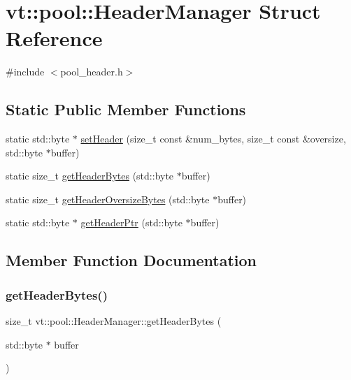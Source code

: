\hypertarget{structvt_1_1pool_1_1_header_manager}{}\section{vt\+:\+:pool\+:\+:Header\+Manager Struct Reference}
\label{structvt_1_1pool_1_1_header_manager}


{\ttfamily \#include $<$pool\+\_\+header.\+h$>$}

\subsection*{Static Public Member Functions}
\begin{DoxyCompactItemize}
\item 
static std\+::byte $\ast$ \hyperlink{structvt_1_1pool_1_1_header_manager_a4b61bc71c3795014a08b318d0c94e92f}{set\+Header} (size\+\_\+t const \&num\+\_\+bytes, size\+\_\+t const \&oversize, std\+::byte $\ast$buffer)
\item 
static size\+\_\+t \hyperlink{structvt_1_1pool_1_1_header_manager_ae5e88f2d369b5129a51281b693181bf4}{get\+Header\+Bytes} (std\+::byte $\ast$buffer)
\item 
static size\+\_\+t \hyperlink{structvt_1_1pool_1_1_header_manager_ad11bbe3dd2cd064840fadbd7533be75a}{get\+Header\+Oversize\+Bytes} (std\+::byte $\ast$buffer)
\item 
static std\+::byte $\ast$ \hyperlink{structvt_1_1pool_1_1_header_manager_a096e79f4565de773a59cfd0084de0152}{get\+Header\+Ptr} (std\+::byte $\ast$buffer)
\end{DoxyCompactItemize}


\subsection{Member Function Documentation}
\mbox{\label{structvt_1_1pool_1_1_header_manager_ae5e88f2d369b5129a51281b693181bf4}} 
\subsubsection{\texorpdfstring{get\+Header\+Bytes()}{getHeaderBytes()}}
{\footnotesize\ttfamily size\+\_\+t vt\+::pool\+::\+Header\+Manager\+::get\+Header\+Bytes (\begin{DoxyParamCaption}\item[{std\+::byte $\ast$}]{buffer }\end{DoxyParamCaption})\hspace{0.3cm}{\ttfamily [static]}}

